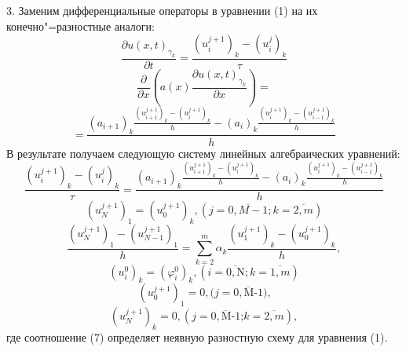 	3. Заменим дифференциальные операторы в уравнении (1) на их конечно"=разностные аналоги:
$$\frac{\partial u{{(x,t)}_{{{\gamma }_{k}}}}}{\partial t}=\frac{{{\left( u_{i}^{j+1} \right)}_{k}}-{{\left( u_{i}^{j} \right)}_{k}}}{\tau }$$
$$\frac{\partial }{\partial x}\left( a(x)\frac{\partial u{{(x,t)}_{{{\gamma }_{k}}}}}{\partial x} \right)=$$
$$=\frac{{{({{a}_{i+1}})}_{k}}\frac{{{(u_{i+1}^{j+1})}_{k}}-{{(u_{i}^{j+1})}_{k}}}{h}-{{({{a}_{i}})}_{k}}\frac{{{(u_{i}^{j+1})}_{k}}-{{(u_{i-1}^{j+1})}_{k}}}{h}}{h}$$
В результате получаем следующую систему линейных алгебраических уравнений:
\begin{equation}\label{tran_eq7}
\frac{{{\left( u_{i}^{j+1} \right)}_{k}}-{{\left( u_{i}^{j} \right)}_{k}}}{\tau }=\frac{{{({{a}_{i+1}})}_{k}}\frac{{{(u_{i+1}^{j+1})}_{k}}-{{(u_{i}^{j+1})}_{k}}}{h}-{{({{a}_{i}})}_{k}}\frac{{{(u_{i}^{j+1})}_{k}}-{{(u_{i-1}^{j+1})}_{k}}}{h}}{h}
\end{equation}
\begin{equation}\label{tran_eq8}
{{\left( u_{N}^{j+1} \right)}_{1}}={{\left( u_{0}^{j+1} \right)}_{k}},(j=\overline{0,M-1};k=\overline{2,m})
\end{equation}
\begin{equation}\label{tran_eq9}
\frac{{{\left( u_{N}^{j+1} \right)}_{1}}-{{\left( u_{N-1}^{j+1} \right)}_{1}}}{h}=\sum\limits_{k=2}^{m}{{{\alpha }_{k}}\frac{{{\left( u_{1}^{j+1} \right)}_{k}}-{{\left( u_{0}^{j+1} \right)}_{k}}}{h}},
\end{equation}
\begin{equation}\label{tran_eq10}
{{\left( u_{i}^{0} \right)}_{k}}={{\left( \varphi _{i}^{0} \right)}_{k}}, (i=\overline{0,\text{N}};k=\overline{1,m})
\end{equation}
\begin{equation}\label{tran_eq11}
{{\left( u_{0}^{j+1} \right)}_{1}}=0,(j=\overline{0,\text{M-1}}\text{)}\text{,}
\end{equation}
\begin{equation}\label{tran_eq12}
{{\left( u_{N}^{j+1} \right)}_{k}}=0, (j=\overline{0,\text{M-1}}\text{;} k=\overline{2,m}),
\end{equation}
где соотношение (7) определяет неявную разностную схему для уравнения (1).

